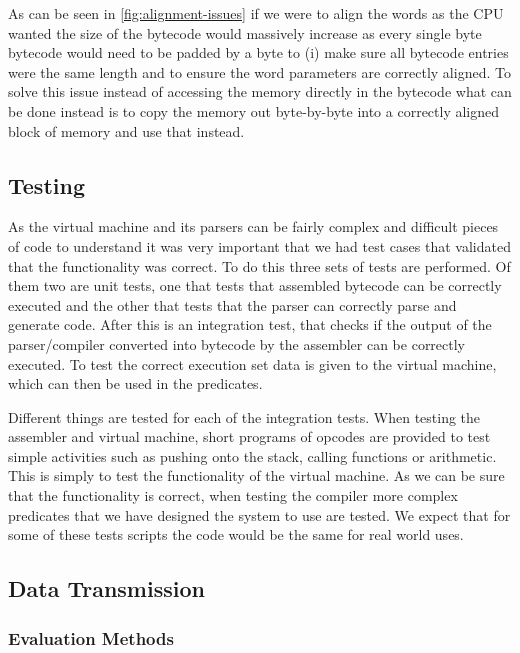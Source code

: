 As can be seen in \autoref{fig:alignment-issues} if we were to align the words as the CPU wanted the size of the bytecode would massively increase as every single byte bytecode would need to be padded by a byte to (i) make sure all bytecode entries were the same length and to ensure the word parameters are correctly aligned. To solve this issue instead of accessing the memory directly in the bytecode what can be done instead is to copy the memory out byte-by-byte into a correctly aligned block of memory and use that instead.

\subsection{Testing}

As the virtual machine and its parsers can be fairly complex and difficult pieces of code to understand it was very important that we had test cases that validated that the functionality was correct. To do this three sets of tests are performed. Of them two are unit tests, one that tests that assembled bytecode can be correctly executed and the other that tests that the parser can correctly parse and generate code. After this is an integration test, that checks if the output of the parser/compiler converted into bytecode by the assembler can be correctly executed. To test the correct execution set data is given to the virtual machine, which can then be used in the predicates.

Different things are tested for each of the integration tests. When testing the assembler and virtual machine, short programs of opcodes are provided to test simple activities such as pushing onto the stack, calling functions or arithmetic. This is simply to test the functionality of the virtual machine. As we can be sure that the functionality is correct, when testing the compiler more complex predicates that we have designed the system to use are tested. We expect that for some of these tests scripts the code would be the same for real world uses.



\subsection{Data Transmission}



\subsubsection{Evaluation Methods}

